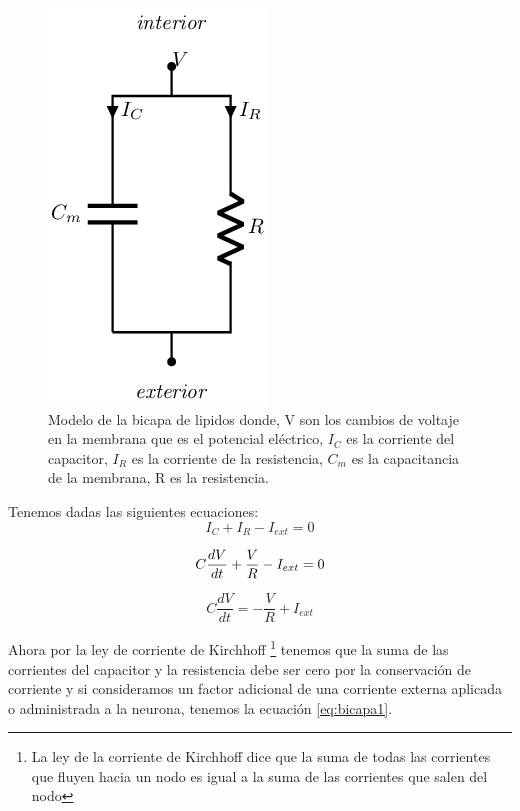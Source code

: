 \begin{figure}[h]
 \centering
 \includegraphics[scale=0.5]{../Figuras/bicapaLipidos.png}
 \caption{Modelo de la bicapa de lipidos donde, V son los cambios de voltaje en la membrana que es el potencial eléctrico, \(I_{C}\) es la corriente del capacitor, \(I_{R}\) es la corriente de la resistencia, \(C_{m}\) es la capacitancia de la membrana, R es la resistencia.}
 \label{fig:circuitoP}
\end{figure}

Tenemos dadas las siguientes ecuaciones:
\begin{equation}
    I_{C} + I_{R} - I_{ext} = 0
  \label{eq:bicapa1}
\end{equation}

\begin{equation}
    C\dfrac{dV}{dt} + \dfrac{V}{R} - I_{ext} = 0 \\
  \label{eq:bicapa2}
\end{equation}

\begin{equation*}
    C\dfrac{dV}{dt} = -\dfrac{V}{R} + I_{ext} 
\end{equation*}

Ahora por la ley de corriente de Kirchhoff \footnote{La ley de la corriente de Kirchhoff dice que la suma de todas las corrientes que fluyen hacia un nodo es igual a la suma de las corrientes que salen del nodo} tenemos que la suma de las corrientes del capacitor y la resistencia debe ser cero
por la conservación de corriente y si consideramos un factor adicional de una corriente externa aplicada o administrada a la neurona, tenemos la ecuación \ref{eq:bicapa1}.

